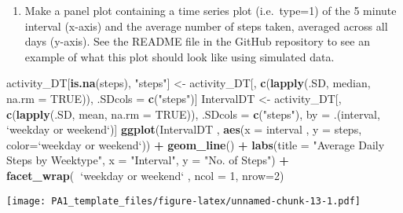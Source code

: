 \documentclass[]{article}
\newenvironment{Shaded}{\begin{snugshade}}{\end{snugshade}}
\newcommand{\KeywordTok}[1]{\textcolor[rgb]{0.13,0.29,0.53}{\textbf{#1}}}
\newcommand{\DataTypeTok}[1]{\textcolor[rgb]{0.13,0.29,0.53}{#1}}
\newcommand{\DecValTok}[1]{\textcolor[rgb]{0.00,0.00,0.81}{#1}}
\newcommand{\StringTok}[1]{\textcolor[rgb]{0.31,0.60,0.02}{#1}}
\newcommand{\OtherTok}[1]{\textcolor[rgb]{0.56,0.35,0.01}{#1}}
\newcommand{\OperatorTok}[1]{\textcolor[rgb]{0.81,0.36,0.00}{\textbf{#1}}}
\newcommand{\NormalTok}[1]{#1}
\providecommand{\tightlist}{%
  \setlength{\itemsep}{0pt}\setlength{\parskip}{0pt}}
\begin{document}
\begin{enumerate}
\def\labelenumi{\arabic{enumi}.}
\setcounter{enumi}{1}
\tightlist
\item
  Make a panel plot containing a time series plot (i.e.~type=1) of the 5
  minute interval (x-axis) and the average number of steps taken,
  averaged across all days (y-axis). See the README file in the GitHub
  repository to see an example of what this plot should look like using
  simulated data.
\end{enumerate}

\begin{Shaded}
\begin{Highlighting}[]
\NormalTok{activity_DT[}\KeywordTok{is.na}\NormalTok{(steps), }\StringTok{"steps"}\NormalTok{] <-}\StringTok{ }\NormalTok{activity_DT[, }\KeywordTok{c}\NormalTok{(}\KeywordTok{lapply}\NormalTok{(.SD, median, }\DataTypeTok{na.rm =} \OtherTok{TRUE}\NormalTok{)), .SDcols =}\StringTok{ }\KeywordTok{c}\NormalTok{(}\StringTok{"steps"}\NormalTok{)]}
\NormalTok{IntervalDT <-}\StringTok{ }\NormalTok{activity_DT[, }\KeywordTok{c}\NormalTok{(}\KeywordTok{lapply}\NormalTok{(.SD, mean, }\DataTypeTok{na.rm =} \OtherTok{TRUE}\NormalTok{)), .SDcols =}\StringTok{ }\KeywordTok{c}\NormalTok{(}\StringTok{"steps"}\NormalTok{), by =}\StringTok{ }\NormalTok{.(interval, }\StringTok{`}\DataTypeTok{weekday or weekend}\StringTok{`}\NormalTok{)] }
\KeywordTok{ggplot}\NormalTok{(IntervalDT , }\KeywordTok{aes}\NormalTok{(}\DataTypeTok{x =}\NormalTok{ interval , }\DataTypeTok{y =}\NormalTok{ steps, }\DataTypeTok{color=}\StringTok{`}\DataTypeTok{weekday or weekend}\StringTok{`}\NormalTok{)) }\OperatorTok{+}\StringTok{ }\KeywordTok{geom_line}\NormalTok{() }\OperatorTok{+}\StringTok{ }\KeywordTok{labs}\NormalTok{(}\DataTypeTok{title =} \StringTok{"Average Daily Steps by Weektype"}\NormalTok{, }\DataTypeTok{x =} \StringTok{"Interval"}\NormalTok{, }\DataTypeTok{y =} \StringTok{"No. of Steps"}\NormalTok{) }\OperatorTok{+}\StringTok{ }\KeywordTok{facet_wrap}\NormalTok{(}\OperatorTok{~}\StringTok{`}\DataTypeTok{weekday or weekend}\StringTok{`}\NormalTok{ , }\DataTypeTok{ncol =} \DecValTok{1}\NormalTok{, }\DataTypeTok{nrow=}\DecValTok{2}\NormalTok{)}
\end{Highlighting}
\end{Shaded}

\texttt{[image: PA1\_template\_files/figure-latex/unnamed-chunk-13-1.pdf]}
\end{document}
